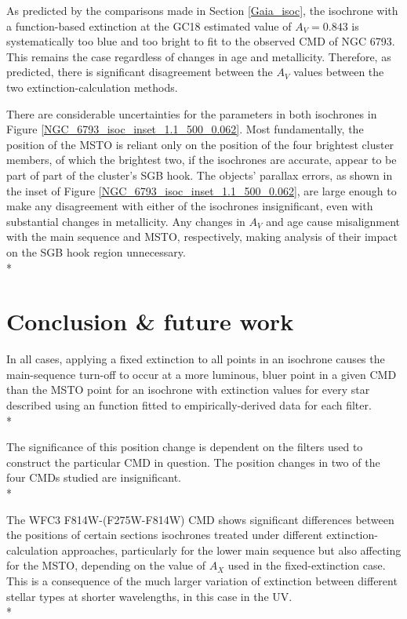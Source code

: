 \documentclass[12pt, a4paper]{report}
\begin{document}
As predicted by the comparisons made in Section \ref{Gaia_isoc}, the isochrone with a function-based extinction at the GC18 estimated value of $A_{V} = 0.843$ is systematically too blue and too bright to fit to the observed CMD of NGC 6793. This remains the case regardless of changes in age and metallicity. Therefore, as predicted, there is significant disagreement between the $A_{V}$ values between the two extinction-calculation methods.

There are considerable uncertainties for the parameters in both isochrones in Figure \ref{NGC_6793_isoc_inset_1.1_500_0.062}. Most fundamentally, the position of the MSTO is reliant only on the position of the four brightest cluster members, of which the brightest two, if the isochrones are accurate, appear to be part of part of the cluster's SGB hook. The objects' parallax errors, as shown in the inset of Figure \ref{NGC_6793_isoc_inset_1.1_500_0.062}, are large enough to make any disagreement with either of the isochrones insignificant, even with substantial changes in metallicity. Any changes in $A_{V}$ and age cause misalignment with the main sequence and MSTO, respectively, making analysis of their impact on the SGB hook region unnecessary.\\*

\chapter{Conclusion \& future work}
In all cases, applying a fixed extinction to all points in an isochrone causes the main-sequence turn-off to occur at a more luminous, bluer point in a given CMD than the MSTO point for an isochrone with extinction values for every star described using an function fitted to empirically-derived data for each filter.\\*

The significance of this position change is dependent on the filters used to construct the particular CMD in question. The position changes in two of the four CMDs studied are insignificant.\\*

The WFC3 F814W-(F275W-F814W) CMD shows significant differences between the positions of certain sections isochrones treated under different extinction-calculation approaches, particularly for the lower main sequence but also affecting for the MSTO, depending on the value of $A_{X}$ used in the fixed-extinction case. This is a consequence of the much larger variation of extinction between different stellar types at shorter wavelengths, in this case in the UV.\\*
\end{document}
